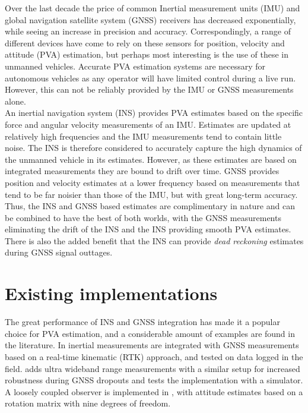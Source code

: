 %
Over the last decade the price of common Inertial measurement units (IMU) and global navigation satellite system (GNSS) receivers has decreased exponentially, while seeing an increase in precision and accuracy. Correspondingly, a range of different devices have come to rely on these sensors for position, velocity and attitude (PVA) estimation, but perhaps most interesting is the use of these in unmanned vehicles. Accurate PVA estimation systems are necessary for autonomous vehicles as any operator will have limited control during a live run. However, this can not be reliably provided by the IMU or GNSS measurements alone.\\

An inertial navigation system (INS) provides PVA estimates based on the specific force and angular velocity measurements of an IMU. Estimates are updated at relatively high frequencies and the IMU measurements tend to contain little noise. The INS is therefore considered to accurately capture the high dynamics of the unmanned vehicle in its estimates. However, as these estimates are based on integrated measurements they are bound to drift over time. GNSS provides position and velocity estimates at a lower frequency based on measurements that tend to be far noisier than those of the IMU, but with great long-term accuracy. Thus, the INS and GNSS based estimates are complimentary in nature and can be combined to have the best of both worlds, with the GNSS measurements eliminating the drift of the INS and the INS providing smooth PVA estimates. There is also the added benefit that the INS can provide \textit{dead reckoning} estimates during GNSS signal outtages.\\



\section{Existing implementations}
The great performance of INS and GNSS integration has made it a popular choice for PVA estimation, and a considerable amount of examples are found in the literature. In \cite{hansen2018nonlinear} inertial measurements are integrated with GNSS measurements based on a real-time kinematic (RTK) approach, and tested on data logged in the field.  \cite{gryte2017robust} adds ultra wideband range measurements with a similar setup for increased robustness during GNSS dropouts and tests the implementation with a simulator. A loosely coupled observer is implemented in \cite{grip2015globally}, with attitude estimates based on a rotation matrix with nine degrees of freedom. \\

